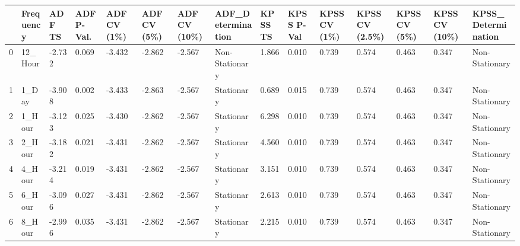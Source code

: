 \begin{tabular}{lllllllllllllll}
\toprule
 & Frequency & ADF TS & ADF P-Val. & ADF CV (1\%) & ADF CV (5\%) & ADF CV (10\%) & ADF_Determination & KPSS TS & KPSS P-Val & KPSS CV (1\%) & KPSS CV (2.5\%) & KPSS CV (5\%) & KPSS CV (10\%) & KPSS_Determination \\
\midrule
0 & 12_Hour & -2.732 & 0.069 & -3.432 & -2.862 & -2.567 & Non-Stationary & 1.866 & 0.010 & 0.739 & 0.574 & 0.463 & 0.347 & Non-Stationary \\
1 & 1_Day & -3.908 & 0.002 & -3.433 & -2.863 & -2.567 & Stationary & 0.689 & 0.015 & 0.739 & 0.574 & 0.463 & 0.347 & Non-Stationary \\
2 & 1_Hour & -3.123 & 0.025 & -3.430 & -2.862 & -2.567 & Stationary & 6.298 & 0.010 & 0.739 & 0.574 & 0.463 & 0.347 & Non-Stationary \\
3 & 2_Hour & -3.182 & 0.021 & -3.431 & -2.862 & -2.567 & Stationary & 4.560 & 0.010 & 0.739 & 0.574 & 0.463 & 0.347 & Non-Stationary \\
4 & 4_Hour & -3.214 & 0.019 & -3.431 & -2.862 & -2.567 & Stationary & 3.151 & 0.010 & 0.739 & 0.574 & 0.463 & 0.347 & Non-Stationary \\
5 & 6_Hour & -3.096 & 0.027 & -3.431 & -2.862 & -2.567 & Stationary & 2.613 & 0.010 & 0.739 & 0.574 & 0.463 & 0.347 & Non-Stationary \\
6 & 8_Hour & -2.996 & 0.035 & -3.431 & -2.862 & -2.567 & Stationary & 2.215 & 0.010 & 0.739 & 0.574 & 0.463 & 0.347 & Non-Stationary \\
\bottomrule
\end{tabular}
